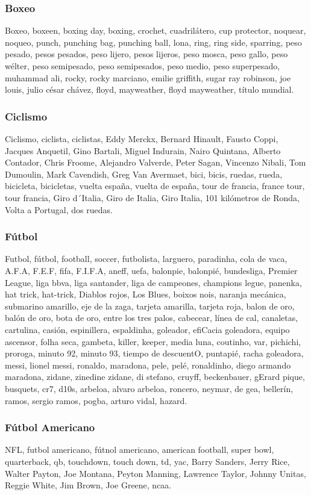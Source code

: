 \documentclass[../all.tex]{subfiles}
\begin{document}
    \subsubsection{Boxeo}
    Boxeo, boxeen, boxing day, boxing,  crochet, cuadrilátero, cup protector, noquear, noqueo, punch, punching bag, punching ball, lona, ring, ring side, sparring, peso pesado, pesos pesados, peso lijero, pesos lijeros, peso mosca, peso gallo, peso wélter, peso semipesado, peso semipesados, peso medio, peso superpesado, muhammad ali, rocky, rocky marciano, emilie griffith, sugar ray robinson, joe louis, julio césar chávez, floyd, mayweather, floyd mayweather, título mundial.
    \subsubsection{Ciclismo}
    Ciclismo, ciclista, ciclistas, Eddy Merckx, Bernard Hinault, Fausto Coppi, Jacques Anquetil, Gino Bartali, Miguel Indurain, Nairo Quintana, Alberto Contador, Chris Froome, Alejandro Valverde, Peter Sagan, Vincenzo Nibali, Tom Dumoulin, Mark Cavendish, Greg Van Avermaet, bici, bicis, ruedas, rueda, bicicleta, bicicletas, vuelta españa, vuelta de españa, tour de francia, france tour, tour francia, Giro d´Italia, Giro de Italia, Giro Italia, 101 kilómetros de Ronda, Volta a Portugal, dos ruedas.
    \subsubsection{Fútbol}
    Futbol, fútbol, football, soccer, futbolista, larguero, paradinha, cola de vaca, A.F.A, F.E.F, fifa, F.I.F.A, aneff, uefa, balonpie, balonpié, bundesliga, Premier League, liga bbva, liga santander, liga de campeones, champions legue, panenka, hat trick, hat-trick, Diablos rojos, Los Blues, boixos nois, naranja mecánica, submarino amarillo, eje de la zaga, tarjeta amarilla, tarjeta roja, balon de oro, balón de oro, bota de oro, entre los tres palos, cabecear, línea de cal, canaletas, cartulina, casión, espinillera, espaldinha, goleador, efiCacia goleadora, equipo ascensor, folha seca, gambeta, killer, keeper, media luna, coutinho, var, pichichi, proroga, minuto 92, minuto 93, tiempo de descuentO, puntapié, racha goleadora, messi, lionel messi, ronaldo, maradona, pele, pelé, ronaldinho, diego armando maradona, zidane, zinedine zidane, di stefano, cruyff, beckenbauer, gErard pique, busquets, cr7, d10s, arbeloa, alvaro arbeloa, roncero, neymar, de gea, bellerín, ramos, sergio ramos, pogba, arturo vidal, hazard.
    \subsubsection{Fútbol Americano}
    NFL, futbol americano, fútnol americano, american football, super bowl, quarterback, 
    qb, touchdown, touch down, td, yac, Barry Sanders, Jerry Rice, Walter Payton, Joe Montana, Peyton Manning, Lawrence Taylor, Johnny Unitas, Reggie White, Jim Brown, Joe Greene, ncaa.
\end{document}
